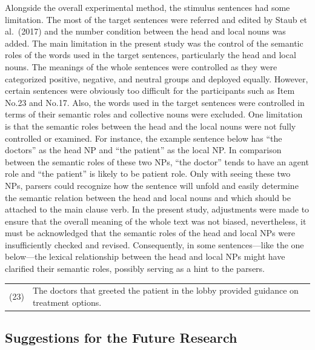 \documentclass[
]{article}
\begin{document}
Alongside the overall experimental method, the stimulus sentences had
some limitation. The most of the target sentences were referred and
edited by Staub et al.~(2017) and the number condition between the head
and local nouns was added. The main limitation in the present study was
the control of the semantic roles of the words used in the target
sentences, particularly the head and local nouns. The meanings of the
whole sentences were controlled as they were categorized positive,
negative, and neutral groups and deployed equally. However, certain
sentences were obviously too difficult for the participants such as Item
No.23 and No.17. Also, the words used in the target sentences were
controlled in terms of their semantic roles and collective nouns were
excluded. One limitation is that the semantic roles between the head and
the local nouns were not fully controlled or examined. For instance, the
example sentence below has ``the doctors'' as the head NP and ``the
patient'' as the local NP. In comparison between the semantic roles of
these two NPs, ``the doctor'' tends to have an agent role and ``the
patient'' is likely to be patient role. Only with seeing these two NPs,
parsers could recognize how the sentence will unfold and easily
determine the semantic relation between the head and local nouns and
which should be attached to the main clause verb. In the present study,
adjustments were made to ensure that the overall meaning of the whole
text was not biased, nevertheless, it must be acknowledged that the
semantic roles of the head and local NPs were insufficiently checked and
revised. Consequently, in some sentences---like the one below---the
lexical relationship between the head and local NPs might have clarified
their semantic roles, possibly serving as a hint to the parsers.

\vspace{1em}
\setlength{\parindent}{0pt}
\noindent
\begin{tabular}[t]{@{}ll}
(23) & The doctors that greeted the patient in the lobby provided guidance on treatment options. \\
\end{tabular}
\vspace{1em}

\subsection{Suggestions for the Future
Research}\label{suggestions-for-the-future-research}

\setlength{\parindent}{1.27cm}
\end{document}
